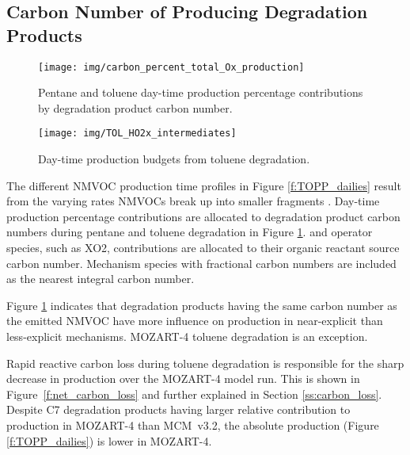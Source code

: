 
\subsection[Carbon Number of Ox Producing Degradation Products]{Carbon Number of  Producing Degradation Products} \label{ss:c_number} %

\begin{figure}
    \centering
    \texttt{[image: img/carbon\_percent\_total\_Ox\_production]}
    \vspace{0mm}
    \caption{Pentane and toluene day-time  production percentage contributions by degradation product carbon number.}
    \vspace{-4mm}
    \label{f:percent_carbon}
\end{figure}

\begin{figure}
    \centering
    \texttt{[image: img/TOL\_HO2x\_intermediates]}
    \vspace{0mm}
    \caption{Day-time  production budgets from toluene degradation.}
    \vspace{-4mm}
    \label{f:toluene_HO2x}
\end{figure} 

The different NMVOC  production time profiles in Figure \ref{f:TOPP_dailies} result from the varying rates NMVOCs break up into smaller fragments \citep{Butler:2011}.
Day-time  production percentage contributions are allocated to degradation product carbon numbers during pentane and toluene degradation in Figure \ref{f:percent_carbon}.
 and operator species, such as XO2, contributions are allocated to their organic reactant source carbon number.
Mechanism species with fractional carbon numbers are included as the nearest integral carbon number. 

Figure \ref{f:percent_carbon} indicates that degradation products having the same carbon number as the emitted NMVOC have more influence on  production in near-explicit than less-explicit mechanisms.
MOZART-4 toluene degradation is an exception.

Rapid reactive carbon loss during toluene degradation is responsible for the sharp decrease in  production over the MOZART-4 model run.
This is shown in \mbox{Figure \ref{f:net_carbon_loss}} and further explained in Section \ref{ss:carbon_loss}.
Despite C7 degradation products having larger relative contribution to  production in MOZART-4 than \mbox{MCM v3.2}, the absolute  production (Figure \ref{f:TOPP_dailies}) is lower in MOZART-4.

